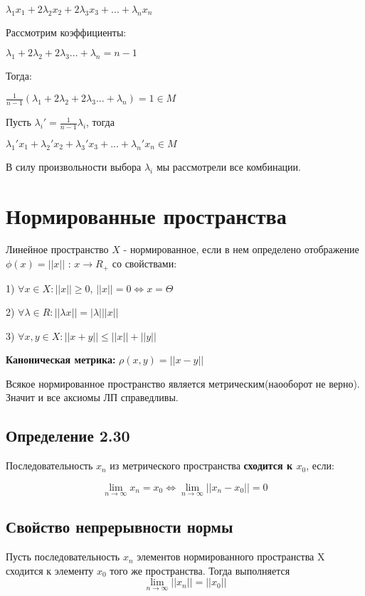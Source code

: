 \documentclass[12pt]{article}
\begin{document}
	$\lambda_1 x_1 + 2\lambda_2 x_2 + 2\lambda_3 x_3 + ... + \lambda_n x_n$
	
	Рассмотрим коэффициенты:
	
	$\lambda_1  + 2\lambda_2 + 2\lambda_3 ...+  \lambda_n = n - 1$
	
	Тогда:
	
	$\frac{1}{n-1}(\lambda_1  + 2\lambda_2 + 2\lambda_3 ...+  \lambda_n) = 1 \in M$
	
	Пусть $\lambda_i' = \frac{1}{n-1}\lambda_i$, тогда
	
	$\lambda_1' x_1  + \lambda_2' x_2 + \lambda_3' x_3 + ...+  \lambda_n' x_n \in M$ 
	
	В силу произвольности выбора $\lambda_i$ мы рассмотрели все комбинации.
	
	
	
\newpage
\section{Нормированные пространства}
		Линейное пространство $X$ - нормированное, если в нем определено отображение $\phi(x) = ||x||$ : $ x \to R_+$ со свойствами:
		
		1) $\forall x \in X: ||x|| \ge 0$, $||x|| = 0 \Leftrightarrow x = \Theta$
		
		2) $\forall \lambda \in R:  || \lambda x || = |\lambda|||x||$
		
		3) $\forall x,y \in X : ||x + y || \leq ||x|| + ||y||$
	
		\textbf{Каноническая метрика:} $\rho(x,y) = ||x-y||$
		
		Всякое нормированное пространство является метрическим(наооборот не верно). Значит и все аксиомы ЛП справедливы.
		
\subsection*{Определение 2.30}\label{eq103}
	
	Последовательность ${x_n}$ из метрического пространства \textbf{сходится к $x_0$}, если:
	
	$$\lim_{n \to \infty} x_n = x_0 \Leftrightarrow \lim_{n \to \infty} ||x_n - x_0|| = 0$$
	
\subsection*{Свойство непрерывности нормы}\label{eq100}
	Пусть последовательность ${x_n}$ элементов нормированного пространства X сходится к элементу $x_0$ того же пространства. Тогда выполняется	
	$$\lim_{n \to \infty} ||x_n|| = ||x_0||$$
		
\end{document}
